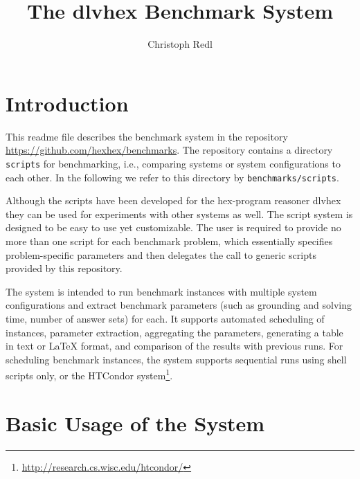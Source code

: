 \documentclass[a4paper]{article}
\newcommand{\dlvhex}{{\sc dlvhex}}
\newcommand{\hex}{{\sc hex}}
\begin{document}
	
	\title{The \dlvhex{} Benchmark System}
	\author{Christoph Redl}
	\maketitle
	
	\section{Introduction}
	\label{sec:introduction}

		This readme file describes the benchmark system
		in the repository \url{https://github.com/hexhex/benchmarks}.
		The repository contains a directory {\tt scripts} for benchmarking, i.e.,
		comparing systems or system configurations to each other.
		In the following we refer to this directory by {\tt benchmarks/scripts}.
		
		Although the scripts have been developed for the \hex-program reasoner \dlvhex{}
		they can be used for experiments with other systems as well.
		The script system is designed to be easy to use yet customizable.
		The user is required to provide no more than one script for each benchmark problem,
		which essentially specifies problem-specific parameters and then delegates the call
		to generic scripts provided by this repository.
		
		The system
		is intended to run benchmark instances with multiple system configurations
		and extract benchmark parameters (such as grounding and solving time, number of answer sets) for each.
		It supports automated scheduling of instances, parameter extraction,
		aggregating the parameters,
		generating a table in text or \LaTeX{} format,
		and comparison of the results with previous runs.
		For scheduling benchmark instances, the system supports sequential runs using shell scripts only,
		or the HTCondor system\footnote{\url{http://research.cs.wisc.edu/htcondor/}}.

	\section{Basic Usage of the System}
	\label{sec:usage}
			
\end{document}
